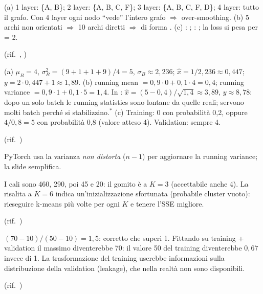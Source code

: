 \begin{soluzione}
(a) 1 layer: \{A, B\}; 2 layer: \{A, B, C, F\}; 3 layer: \{A, B, C, F, D\}; 4 layer: tutto il grafo. Con 4 layer ogni nodo ``vede'' l'intero
grafo $\Rightarrow$ over-smoothing.
(b) 5 archi non orientati $\Rightarrow$ 10 archi diretti $\Rightarrow$  di forma .
(c) : ; : ; la loss si pesa per  = 2.

(rif.\ , )
\end{soluzione}

\begin{soluzione}
(a) $\mu_B = 4$, $\sigma^2_B = (9+1+1+9)/4 = 5$, $\sigma_B \approx 2{,}236$; $\hat x = 1/2{,}236 \approx 0{,}447$; $y = 2\cdot0{,}447+1 \approx 1{,}89$.
(b) running mean $= 0{,}9\cdot0 + 0{,}1\cdot4 = 0{,}4$; running variance $= 0{,}9\cdot1 + 0{,}1\cdot5 = 1{,}4$. In :
$\hat x = (5-0{,}4)/\sqrt{1{,}4} \approx 3{,}89$, $y \approx 8{,}78$: dopo un solo batch le running statistics sono lontane da quelle reali;
servono molti batch perché si stabilizzino.$^{*}$
(c) Training: 0 con probabilità 0,2, oppure $4/0{,}8 = 5$ con probabilità 0,8 (valore atteso 4). Validation: sempre 4.

(rif.\ )
\end{soluzione}
\begin{integrazione}
PyTorch usa la varianza \emph{non distorta} ($n-1$) per aggiornare la running variance; la slide semplifica.
\end{integrazione}

\begin{soluzione}
I cali sono 460, 290, poi 45 e 20: il gomito è a $K=3$ (accettabile anche 4). La risalita a $K=6$ indica un'inizializzazione sfortunata
(probabile cluster vuoto): rieseguire k-means più volte per ogni $K$ e tenere l'SSE migliore.

(rif.\ )
\end{soluzione}

\begin{soluzione}
$(70-10)/(50-10) = 1{,}5$: corretto che superi 1. Fittando su training + validation il massimo diventerebbe 70: il valore 50 del training
diventerebbe $0{,}67$ invece di 1. La trasformazione del training userebbe informazioni sulla distribuzione della validation (leakage), che
nella realtà non sono disponibili.

(rif.\ )
\end{soluzione}

